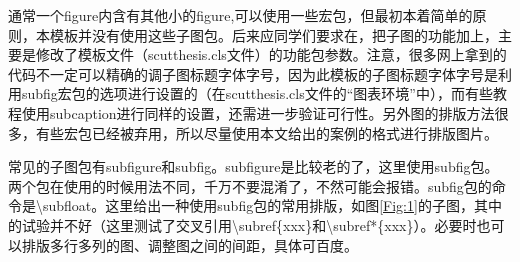 \cite{1985}
通常一个figure内含有其他小的figure,可以使用一些宏包，但最初本着简单的原则，本模板并没有使用这些子图包。后来应同学们要求在，把子图的功能加上，主要是修改了模板文件（scutthesis.cls文件）的功能包参数。注意，很多网上拿到的代码不一定可以精确的调子图标题字体字号，因为此模板的子图标题字体字号是利用subfig宏包的选项进行设置的（在scutthesis.cls文件的“图表环境”中），而有些教程使用subcaption进行同样的设置，还需进一步验证可行性。另外图的排版方法很多，有些宏包已经被弃用，所以尽量使用本文给出的案例的格式进行排版图片。

常见的子图包有subfigure和subfig。subfigure是比较老的了，这里使用subfig包。两个包在使用的时候用法不同，千万不要混淆了，不然可能会报错。subfig包的命令是\textbackslash{}subfloat。这里给出一种使用subfig包的常用排版，如图\ref{Fig:1}的子图，其中的试验并不好（这里测试了交叉引用\textbackslash{}subref\{xxx\}和\textbackslash{}subref*\{xxx\}）。必要时也可以排版多行多列的图、调整图之间的间距，具体可百度。

